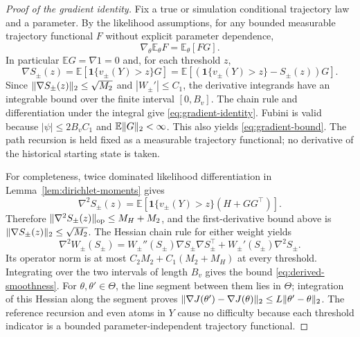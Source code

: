 \documentclass[11pt]{article}
\newcommand{\E}{\mathbb E}
\newcommand{\1}{\mathbf 1}
\newcommand{\op}{\mathrm{op}}
\DeclarePairedDelimiter{\norm}{\lVert}{\rVert}
\theoremstyle{definition}
\begin{document}
\begin{proof}[Proof of the gradient identity]
Fix a true or simulation conditional trajectory law and a parameter. By the likelihood assumptions, for any bounded measurable trajectory functional $F$ without explicit parameter dependence,
\begin{equation}\label{eq:likelihood-interface}
 \nabla_\theta\E_\theta F=\E_\theta[FG].
\end{equation}
In particular $\E G=\nabla 1=0$ and, for each threshold $z$,
\[
 \nabla S_\pm(z)=\E[\1\{v_\pm(Y)>z\}G]
 =\E[(\1\{v_\pm(Y)>z\}-S_\pm(z))G].
\]
Since $\norm{\nabla S_\pm(z)}_2\le\sqrt{M_2}$ and $|W_\pm'|\le C_1$, the derivative integrands have an integrable bound over the finite interval $[0,B_v]$. The chain rule and differentiation under the integral give \eqref{eq:gradient-identity}. Fubini is valid because $|\psi|\le2B_vC_1$ and $\E\norm{G}_2<\infty$. This also yields \eqref{eq:gradient-bound}. The path recursion is held fixed as a measurable trajectory functional; no derivative of the historical starting state is taken.

For completeness, twice dominated likelihood differentiation in Lemma~\ref{lem:dirichlet-moments} gives
\[
 \nabla^2 S_\pm(z)=\E[\1\{v_\pm(Y)>z\}(H+GG^\top)].
\]
Therefore $\norm{\nabla^2S_\pm(z)}_{\op}\le M_H+M_2$, and the first-derivative bound above is $\norm{\nabla S_\pm(z)}_2\le\sqrt{M_2}$. The Hessian chain rule for either weight yields
\[
 \nabla^2 W_\pm(S_\pm)
 =W_\pm''(S_\pm)\nabla S_\pm\nabla S_\pm^\top
 +W_\pm'(S_\pm)\nabla^2S_\pm.
\]
Its operator norm is at most $C_2M_2+C_1(M_2+M_H)$ at every threshold. Integrating over the two intervals of length $B_v$ gives the bound \eqref{eq:derived-smoothness}. For $\theta,\theta'\in\Theta$, the line segment between them lies in $\Theta$; integration of this Hessian along the segment proves
$\norm{\nabla J(\theta')-\nabla J(\theta)}_2\le L\norm{\theta'-\theta}_2$.
The reference recursion and even atoms in $Y$ cause no difficulty because each threshold indicator is a bounded parameter-independent trajectory functional.
\end{proof}
\end{document}
